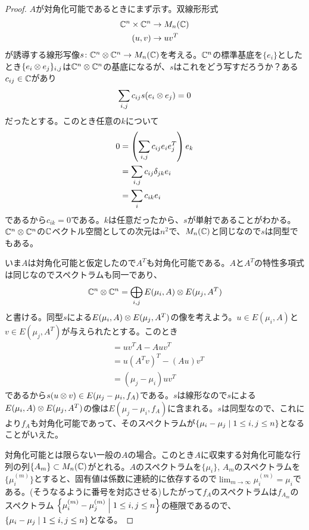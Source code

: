 \begin{proof}
  $A$が対角化可能であるときにまず示す。双線形形式
  \begin{align*}
    {\mathbb C}^n \times {\mathbb C}^n &\to M_n({\mathbb C}) \\
    (u,v) &\to uv^T
  \end{align*}
  が誘導する線形写像$s \colon {\mathbb C}^n \otimes {\mathbb C}^n \to M_n({\mathbb C})$を考える。${\mathbb C}^n$の標準基底を$\{ e_i \}$としたとき$\{ e_i \otimes e_j \}_{i,j}$は${\mathbb C}^n \otimes {\mathbb C}^n$の基底になるが、$s$はこれをどう写すだろうか？ある$c_{ij} \in {\mathbb C}$があり
  \[
  \sum_{i,j} c_{ij} s(e_i \otimes e_j) = 0
  \]
  だったとする。このとき任意の$k$について
  \begin{align*}
    0 &= \left( \sum_{i,j} c_{ij} e_i e_j^T  \right) e_k \\
    &= \sum_{i,j} c_{ij} {\delta}_{jk}  e_i \\
    &= \sum_i c_{ik } e_i
  \end{align*}
  であるから$c_{ik}=0$である。$k$は任意だったから、$s$が単射であることがわかる。${\mathbb C}^n \otimes {\mathbb C}^n$の${\mathbb C}$ベクトル空間としての次元は$n^2$で、$M_n({\mathbb C})$と同じなので$s$は同型でもある。

  いま$A$は対角化可能と仮定したので$A^T$も対角化可能である。$A$と$A^T$の特性多項式は同じなのでスペクトラムも同一であり、
  \[
  {\mathbb C}^n \otimes {\mathbb C}^n = \bigoplus_{i,j} E(\mu_i,A) \otimes E(\mu_j,A^T)
  \]
  と書ける。同型$s$による$E(\mu_i,A) \otimes E(\mu_j,A^T)$の像を考えよう。$u \in E(\mu_i,A)$と$v \in E(\mu_j,A^T)$が与えられたとする。このとき
  \begin{align*}
    [uv^T, A] &= uv^T A - A uv^T \\
    &= u (A^T v)^T - (Au) v^T \\
    &= (\mu_j - \mu_i) uv^T
  \end{align*}
  であるから$s(u \otimes v) \in E(\mu_j - \mu_i, f_A)$である。$s$は線形なので$s$による$E(\mu_i,A) \otimes E(\mu_j,A^T)$の像は$ E(\mu_j - \mu_i, f_A)$に含まれる。$s$は同型なので、これにより$f_A$も対角化可能であって、そのスペクトラムが$\left\{  \mu_i - \mu_j  \mathrel{} \middle| \mathrel{} 1 \leq i,j \leq n  \right\}$となることがいえた。

  対角化可能とは限らない一般の$A$の場合。このとき$A$に収束する対角化可能な行列の列$\{ A_m \} \subset M_n({\mathbb C})$がとれる。$A$のスペクトラムを$\{  \mu_i \}$, $A_m$のスペクトラムを$\{ \mu_i^{(m)} \}$とすると、固有値は係数に連続的に依存するので$\lim_{m \to \infty} \mu_i^{(m)} = \mu_i$である。(そうなるように番号を対応させる)したがって$f_A$のスペクトラムは$f_{A_m}$のスペクトラム
  $\left\{  \mu_i^{(m)} - \mu_j^{(m)}   \mathrel{} \middle| \mathrel{} 1 \leq i,j \leq n \right\}$の極限であるので、$\left\{  \mu_i - \mu_j  \mathrel{} \middle| \mathrel{} 1 \leq i,j \leq n  \right\}$となる。
\end{proof}


